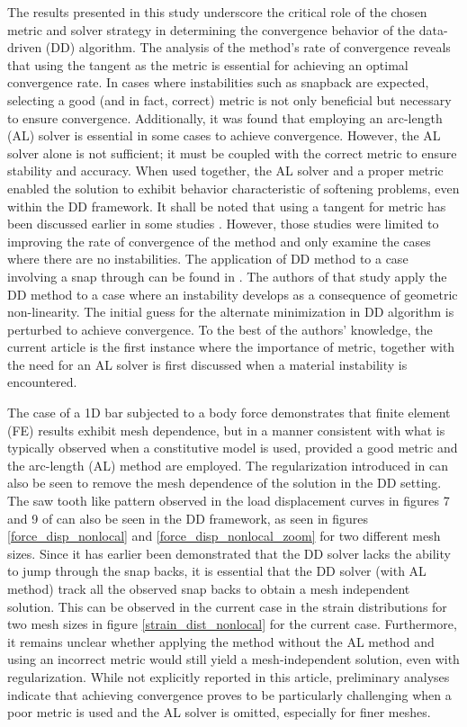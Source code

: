 \documentclass[10pt]{elsarticle}
\begin{document}
The results presented in this study underscore the critical role of the chosen metric and solver strategy in determining the convergence behavior of the data-driven (DD) algorithm. The analysis of the method’s rate of convergence reveals that using the tangent as the metric is essential for achieving an optimal convergence rate. In cases where instabilities such as snapback are expected, selecting a good (and in fact, correct) metric is not only beneficial but necessary to ensure convergence. Additionally, it was found that employing an arc-length (AL) solver is essential in some cases to achieve convergence. However, the AL solver alone is not sufficient; it must be coupled with the correct metric to ensure stability and accuracy. When used together, the AL solver and a proper metric enabled the solution to exhibit behavior characteristic of softening problems, even within the DD framework. It shall be noted that using a tangent for metric has been discussed earlier in some studies \cite{Pham2023,Nguyen2022,Kanno2019}. However, those studies were limited to improving the rate of convergence of the method and only examine the cases where there are no instabilities. The application of DD method to a case involving a snap through can be found in \cite{Kuang2023}. The authors of that study apply the DD method to a case where an instability develops as a consequence of geometric non-linearity. The initial guess for the alternate minimization in DD algorithm is perturbed to achieve convergence. To the best of the authors' knowledge, the current article is the first instance where the importance of metric, together with the need for an AL solver is first discussed when a material instability is encountered. 


The case of a 1D bar subjected to a body force demonstrates that finite element (FE) results exhibit mesh dependence, but in a manner consistent with what is typically observed when a constitutive model is used, provided a good metric and the arc-length (AL) method are employed. The regularization introduced in \cite{Kamasamudram2023} can also be seen to remove the mesh dependence of the solution in the DD setting. The saw tooth like pattern observed in the load displacement curves in figures 7 and 9 of \cite{Kamasamudram2023} can also be seen in the DD framework, as seen in figures \ref{force_disp_nonlocal} and \ref{force_disp_nonlocal_zoom} for two different mesh sizes. Since it has earlier been demonstrated that the DD solver lacks the ability to jump through the snap backs, it is essential that the DD solver (with AL method) track all the observed snap backs to obtain a mesh independent solution. This can be observed in the current case in the strain distributions for two mesh sizes in figure \ref{strain_dist_nonlocal} for the current case. Furthermore, it remains unclear whether applying the method without the AL method and using an incorrect metric would still yield a mesh-independent solution, even with regularization. While not explicitly reported in this article, preliminary analyses indicate that achieving convergence proves to be particularly challenging when a poor metric is used and the AL solver is omitted, especially for finer meshes.
\end{document}

